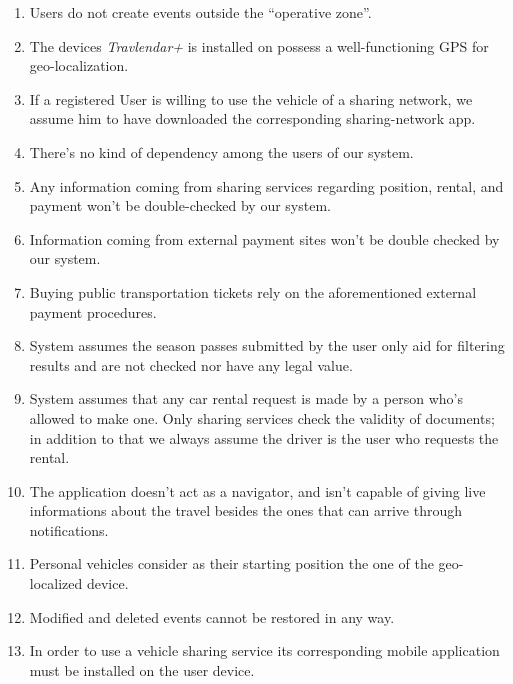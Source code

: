 			\begin{enumerate}
				\item Users do not create events outside the “operative zone”.
				\item The devices \textit{Travlendar+} is installed on possess a well-functioning GPS for geo-localization.
				\item If a registered User is willing to use the vehicle of a sharing network, we assume him to have downloaded the corresponding sharing-network app.
				\item There’s no kind of dependency among the users of our system.
				\item Any information coming from sharing services regarding position, rental, and payment won’t be double-checked by our system.
				\item Information coming from external payment sites won’t be double checked by our system.
				\item Buying public transportation tickets rely on the aforementioned external payment procedures.
				\item System assumes the season passes submitted by the user only aid for filtering results and are not checked nor have any legal value.
				\item System assumes that any car rental request is made by a person who’s allowed to make one. Only sharing services check the validity of documents; in addition to that we always assume the driver is the user who requests the rental.
				\item The application doesn't act as a navigator, and isn't capable of giving live informations about the travel besides the ones that can arrive through notifications.
				\item Personal vehicles consider as their starting position the one of the geo-localized device.
				\item Modified and deleted events cannot be restored in any way.
				\item In order to use a vehicle sharing service its corresponding mobile application must be installed on the user device.		
		\end{enumerate}
